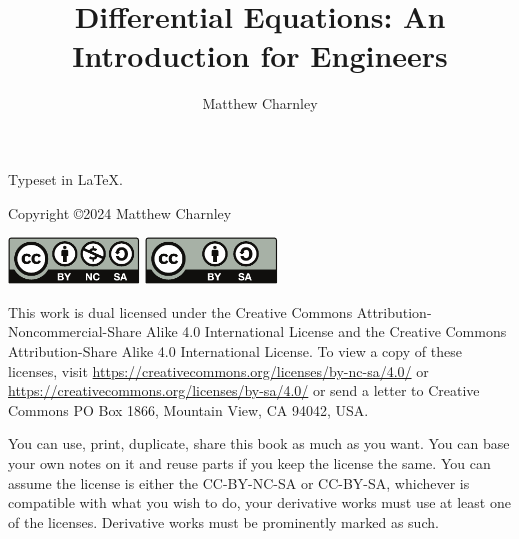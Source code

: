 \documentclass[12pt]{book}
\author{Matthew Charnley}
\title{Differential Equations: An Introduction for Engineers}
\begin{document}
\newcommand{\theversion}{0.99}
\myTitlePage

\newpage

\vspace*{\fill}

\begin{small}
\noindent
Typeset in \LaTeX.

\bigskip

\noindent
Copyright \copyright 2024 Matthew Charnley



\bigskip

\noindent
\includegraphics[width=1.38in]{figures/license}
\quad
\includegraphics[width=1.38in]{figures/license2}

\bigskip

\noindent
This work
is dual licensed under
the Creative Commons
Attribution-Non\-commercial-Share Alike 4.0 International License and
the Creative Commons
Attribution-Share Alike 4.0 International License.
To view a
copy of these licenses, visit
\url{https://creativecommons.org/licenses/by-nc-sa/4.0/}
or
\url{https://creativecommons.org/licenses/by-sa/4.0/}
or send a letter to
Creative Commons
PO Box 1866, Mountain View, CA 94042, USA\@.

\bigskip

\noindent
You can use, print, duplicate, share this book as much as you want.  You can
base your own notes on it and reuse parts if you keep the license the
same.  You can assume the license is either the
CC-BY-NC-SA or CC-BY-SA\@,
whichever is compatible with what you wish to do, your derivative works must
use at least one of the licenses.
Derivative works must be prominently marked as such.


\end{small}
\end{document}
